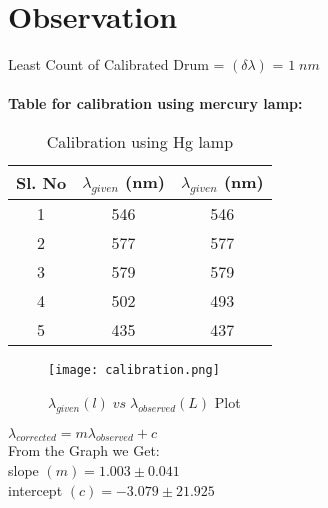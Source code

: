 \section{Observation}
	Least Count of Calibrated Drum = $(\delta \lambda)$ = $1\;nm$\\\\
	\textbf{Table for calibration using mercury lamp:}

	\begin{table}[H]
		\centering
		\begin{tabular}{|c|c|c|}
		\hline
		\textbf{Sl. No} & $\lambda_{given}$ (nm) & $\lambda_{given}$ (nm) \\ \hline
		1 & 546 & 546 \\ \hline
		2 & 577 & 577 \\ \hline
		3 & 579 & 579 \\ \hline
		4 & 502 & 493 \\ \hline
		5 & 435 & 437 \\ \hline
		\end{tabular}%
		\caption{Calibration using Hg lamp}
		\label{tab:calib}
	\end{table}

	\begin{figure}[H]
		\texttt{[image: calibration.png]}
		\caption{$\lambda_{given}(l)\;vs\;\lambda_{observed} (L)$ Plot}
		\label{graph:calib}
	\end{figure}

	\vspace{-1cm}
	\noindent $\lambda_{corrected} = m\lambda_{observed} + c$\\
	From the Graph we Get:\\
	\indent slope $(m) = 1.003 \pm 0.041$\\
	\indent intercept $(c) = -3.079 \pm 21.925$


